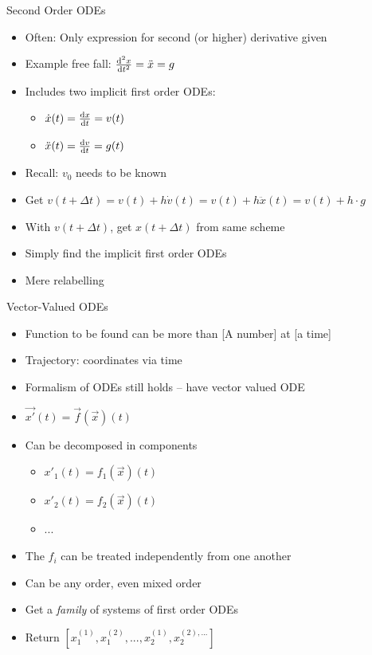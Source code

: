 \begin{frame}{Second Order ODEs}
%
\begin{itemize}
\item Often: Only expression for second (or higher) derivative given
\item Example free fall: $\dv[2]{x}{t} = \ddot{x} = g$
\item Includes two implicit first order ODEs:
	\begin{itemize}
	\item $ \dot{x}(t) = \dv{x}{t}(t) = v(t)$
	\item $\ddot{x}(t) = \dv{v}{t}(t) = g(t)$
	\end{itemize}
\item Recall: $v_0$ needs to be known
\item Get $v(t + \Delta t) = v(t) + h \dot{v}(t) = v(t) + h \ddot{x}(t) = v(t) + h \cdot g$
\item With $v(t + \Delta t)$, get $x(t + \Delta t)$ from same scheme
\item[\Thus] Simply find the implicit first order ODEs
\item[\Thus] Mere relabelling
\end{itemize}
%
\end{frame}


\begin{frame}{Vector-Valued ODEs}
%
\begin{itemize}
\item Function to be found can be more than [A number] at [a time]
\item Trajectory: coordinates via time
\item Formalism of ODEs still holds -- have vector valued ODE
\item $\vec{x'}(t) = \vec{f}(\vec{x})(t)$
\item Can be decomposed in components
	\begin{itemize}
	\item $x'_1(t) = f_1(\vec{x})(t)$
	\item $x'_2(t) = f_2(\vec{x})(t)$
	\item ...
	\end{itemize}
\item The $f_i$ can be treated independently from one another
\item Can be any order, even mixed order
\item Get a \emph{family} of systems of first order ODEs
\item Return $[x_1^{(1)}, x_1^{(2)}, ..., x_2^{(1)}, x_2^{(2), ...}]$
\end{itemize}
%
\end{frame}

